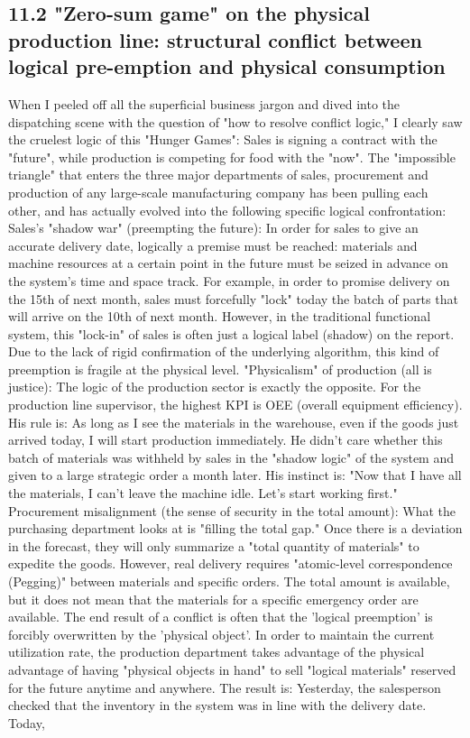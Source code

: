 \documentclass[11pt,a4paper]{article}
\begin{document}
\subsection*{11.2 "Zero-sum game" on the physical production line: structural conflict between logical pre-emption and physical consumption}


When I peeled off all the superficial business jargon and dived into the dispatching scene with the question of "how to resolve conflict logic," I clearly saw the cruelest logic of this "Hunger Games": Sales is signing a contract with the "future", while production is competing for food with the "now". The "impossible triangle" that enters the three major departments of sales, procurement and production of any large-scale manufacturing company has been pulling each other, and has actually evolved into the following specific logical confrontation: Sales's "shadow war" (preempting the future): In order for sales to give an accurate delivery date, logically a premise must be reached: materials and machine resources at a certain point in the future must be seized in advance on the system's time and space track. For example, in order to promise delivery on the 15th of next month, sales must forcefully "lock" today the batch of parts that will arrive on the 10th of next month. However, in the traditional functional system, this "lock-in" of sales is often just a logical label (shadow) on the report. Due to the lack of rigid confirmation of the underlying algorithm, this kind of preemption is fragile at the physical level. "Physicalism" of production (all is justice): The logic of the production sector is exactly the opposite. For the production line supervisor, the highest KPI is OEE (overall equipment efficiency). His rule is: As long as I see the materials in the warehouse, even if the goods just arrived today, I will start production immediately. He didn't care whether this batch of materials was withheld by sales in the "shadow logic" of the system and given to a large strategic order a month later. His instinct is: "Now that I have all the materials, I can't leave the machine idle. Let's start working first." Procurement misalignment (the sense of security in the total amount): What the purchasing department looks at is "filling the total gap." Once there is a deviation in the forecast, they will only summarize a "total quantity of materials" to expedite the goods. However, real delivery requires "atomic-level correspondence (Pegging)" between materials and specific orders. The total amount is available, but it does not mean that the materials for a specific emergency order are available. The end result of a conflict is often that the 'logical preemption' is forcibly overwritten by the 'physical object'. In order to maintain the current utilization rate, the production department takes advantage of the physical advantage of having "physical objects in hand" to sell "logical materials" reserved for the future anytime and anywhere. The result is: Yesterday, the salesperson checked that the inventory in the system was in line with the delivery date. Today, 
\end{document}
